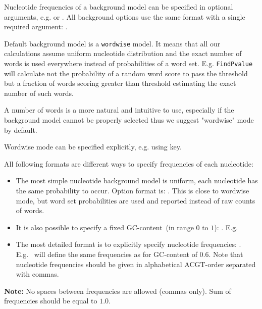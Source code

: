Nucleotide frequencies of a background model can be specified in optional arguments, e.g.  or . All background options use the same format with a single required argument: .

Default background model is a \texttt{wordwise} model. It means that all our calculations assume uniform nucleotide distribution and the exact number of words is used everywhere instead of probabilities of a word set.
E.g. \texttt{FindPvalue} will calculate not the probability of a random word score to pass the threshold but a fraction of words scoring greater than threshold estimating the exact number of such words.

A number of words is a more natural and intuitive to use, especially if the background model cannot be properly selected
thus we suggest "wordwise" mode by default.

Wordwise mode can be specified explicitly, e.g. using  key.

All following formats are different ways to specify frequencies of each nucleotide:
\begin{itemize}
\item The most simple nucleotide background model is uniform, each nucleotide has the same probability to occur. Option format is: . This is close to wordwise mode, but word set probabilities are used and reported instead of raw counts of words.
\item It is also possible to specify a fixed GC-content~(in range $0$ to $1$): . E.g.~
\item The most detailed format is to explicitly specify nucleotide frequencies: . E.g.~ will define the same frequencies as for GC-content of $0.6$. Note that nucleotide frequencies should be given in alphabetical ACGT-order separated with commas. 
\end{itemize}

\textbf{Note:} No spaces between frequencies are allowed (commas only). Sum of frequencies should be equal to $1.0$.
